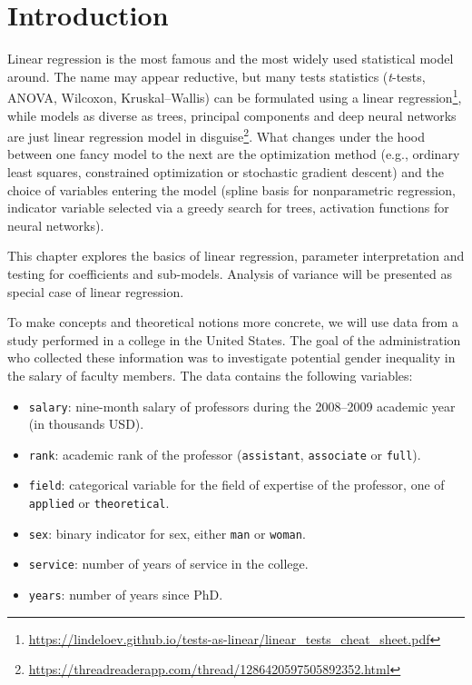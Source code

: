 \documentclass[
  11pt,
  letterpaper,
]{book}
\providecommand{\tightlist}{%
  \setlength{\itemsep}{0pt}\setlength{\parskip}{0pt}}
\renewcommand{\href}[2]{#2\footnote{\url{#1}}}
\theoremstyle{definition}
\theoremstyle{definition}
\theoremstyle{definition}
\theoremstyle{remark}
\begin{document}
\hypertarget{introduction}{%
\section{Introduction}\label{introduction}}

Linear regression is the most famous and the most widely used statistical model around. The name may appear reductive, but many tests statistics (\emph{t}-tests, ANOVA, Wilcoxon, Kruskal--Wallis) \href{https://lindeloev.github.io/tests-as-linear/linear_tests_cheat_sheet.pdf}{can be formulated using a linear regression}, while \href{https://threadreaderapp.com/thread/1286420597505892352.html}{models as diverse as trees, principal components and deep neural networks are just linear regression model in disguise}. What changes under the hood between one fancy model to the next are the optimization method (e.g., ordinary least squares, constrained optimization or stochastic gradient descent) and the choice of variables entering the model (spline basis for nonparametric regression, indicator variable selected via a greedy search for trees, activation functions for neural networks).

This chapter explores the basics of linear regression, parameter interpretation and testing for coefficients and sub-models. Analysis of variance will be presented as special case of linear regression.

To make concepts and theoretical notions more concrete, we will use data from a study performed in a college in the United States. The goal of the administration who collected these information was to investigate potential gender inequality in the salary of faculty members. The data contains the following variables:

\begin{itemize}
\tightlist
\item
  \texttt{salary}: nine-month salary of professors during the 2008--2009 academic year (in thousands USD).
\item
  \texttt{rank}: academic rank of the professor (\texttt{assistant}, \texttt{associate} or \texttt{full}).
\item
  \texttt{field}: categorical variable for the field of expertise of the professor, one of \texttt{applied} or \texttt{theoretical}.
\item
  \texttt{sex}: binary indicator for sex, either \texttt{man} or \texttt{woman}.
\item
  \texttt{service}: number of years of service in the college.
\item
  \texttt{years}: number of years since PhD.
\end{itemize}
\end{document}
